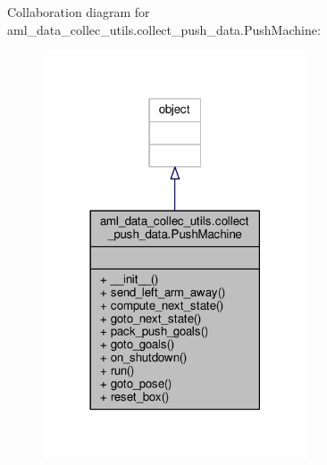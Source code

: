 Collaboration diagram for aml\-\_\-data\-\_\-collec\-\_\-utils.\-collect\-\_\-push\-\_\-data.\-Push\-Machine\-:
\nopagebreak
\begin{figure}[H]
\begin{center}
\leavevmode
\includegraphics[width=222pt]{classaml__data__collec__utils_1_1collect__push__data_1_1_push_machine__coll__graph}
\end{center}
\end{figure}
